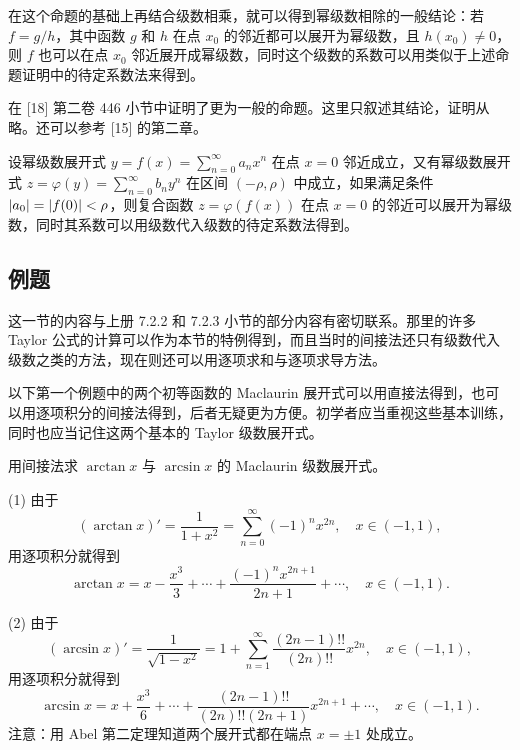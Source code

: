 \begin{xremark}
在这个命题的基础上再结合级数相乘，就可以得到幂级数相除的一般结论：若 $f=g/h$，其中函数 $g$ 和 $h$ 在点 $x_0$ 的邻近都可以展开为幂级数，且 $h(x_0)\ne0$，则 $f$ 也可以在点 $x_0$ 邻近展开成幂级数，同时这个级数的系数可以用类似于上述命题证明中的待定系数法来得到。
\end{xremark}

\begin{xremark}
在 [18] 第二卷 446 小节中证明了更为一般的命题。这里只叙述其结论，证明从略。还可以参考 [15] 的第二章。
\end{xremark}

\begin{xproposition}
设幂级数展开式 $y=f(x)=\displaystyle\sum_{n=0}^{\infty}a_nx^n$ 在点 $x=0$ 邻近成立，又有幂级数展开式 $z=\varphi(y)=\displaystyle\sum_{n=0}^{\infty}b_ny^n$ 在区间 $(-\rho,\rho)$ 中成立，如果满足条件 $\lvert a_0\rvert=\lvert f(0)\rvert<\rho$，则复合函数 $z=\varphi(f(x))$ 在点 $x=0$ 的邻近可以展开为幂级数，同时其系数可以用级数代入级数的待定系数法得到。
\end{xproposition}

\subsection{例题}

这一节的内容与上册 7.2.2 和 7.2.3 小节的部分内容有密切联系。那里的许多 Taylor 公式的计算可以作为本节的特例得到，而且当时的间接法还只有级数代入级数之类的方法，现在则还可以用逐项求和与逐项求导方法。

以下第一个例题中的两个初等函数的 Maclaurin 展开式可以用直接法得到，也可以用逐项积分的间接法得到，后者无疑更为方便。初学者应当重视这些基本训练，同时也应当记住这两个基本的 Taylor 级数展开式。

\begin{xexample}[14.4.1]
用间接法求 $\arctan x$ 与 $\arcsin x$ 的 Maclaurin 级数展开式。
\end{xexample}
\begin{xsolution}
(1) 由于
\[
  (\arctan x)'=\frac1{1+x^2}=\sum_{n=0}^{\infty}(-1)^nx^{2n},\quad x\in(-1,1),
\]
用逐项积分就得到
\[
  \arctan x=x-\frac{x^3}{3}+\cdots+\frac{(-1)^nx^{2n+1}}{2n+1}+\cdots,\quad x\in(-1,1).
\]

(2) 由于
\[
  (\arcsin x)'=\frac1{\sqrt{1-x^2}}=1+\sum_{n=1}^{\infty}\frac{(2n-1)!!}{(2n)!!}x^{2n},\quad x\in(-1,1),
\]
用逐项积分就得到
\[
  \arcsin x=x+\frac{x^3}{6}+\cdots+\frac{(2n-1)!!}{(2n)!!(2n+1)}x^{2n+1}+\cdots,\quad x\in(-1,1).
\]
注意：用 Abel 第二定理知道两个展开式都在端点 $x=\pm1$ 处成立。
\end{xsolution}

